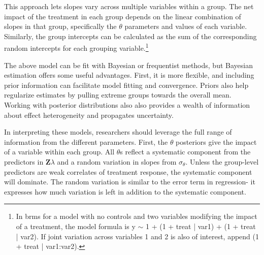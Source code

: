 \documentclass[12pt]{article}
\begin{document}
This approach lets slopes vary across multiple variables within a group. 
The net impact of the treatment in each group depends on the linear combination of slopes in that group, specifically the $\theta$ parameters and values of each variable. 
Similarly, the group intercepts can be calculated as the sum of the corresponding random intercepts for each grouping variable.\footnote{In brms for a model with no controls and two variables modifying the impact of a treatment, the model formula is y $\sim$ 1 + (1 + treat | var1) + (1 + treat | var2). If joint variation across variables 1 and 2 is also of interest, append (1 + treat | var1:var2).}  




The above model can be fit with Bayesian or frequentist methods, but Bayesian estimation offers some useful advantages.
First, it is more flexible, and including prior information can facilitate model fitting and convergence. 
Priors also help regularize estimates by pulling extreme groups towards the overall mean.
Working with posterior distributions also also provides a wealth of information about effect heterogeneity and propagates uncertainty.  


In interpreting these models, researchers should leverage the full range of information from the different parameters. 
First, the $\theta$ posteriors give the impact of a variable within each group.
All $\theta$s reflect a systematic component from the predictors in \textbf{Z}$\lambda$ and a random variation in slopes from $\sigma_\theta$. 
Unless the group-level predictors are weak correlates of treatment response, the systematic component will dominate. 
The random variation is similar to the error term in regression- it expresses how much variation is left in addition to the systematic component. 
\end{document}
